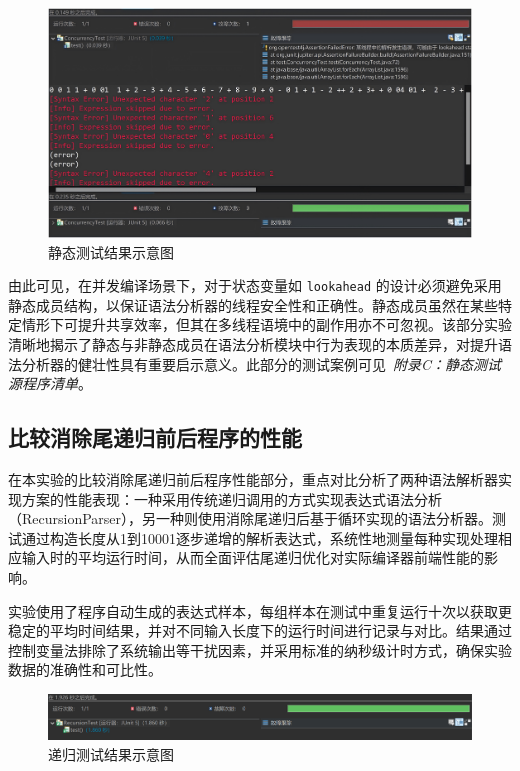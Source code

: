 \documentclass[a4paper, twoside, utf8]{ctexart}
\begin{document}
    \begin{figure}[htbp]
        \centering
        \includegraphics[width=0.8\linewidth]{figure/ConcurrencyTest.png}
        \caption{静态测试结果示意图}
    \end{figure}

    由此可见，在并发编译场景下，对于状态变量如 \verb|lookahead| 的设计必须避免采用静态成员结构，以保证语法分析器的线程安全性和正确性。静态成员虽然在某些特定情形下可提升共享效率，但其在多线程语境中的副作用亦不可忽视。该部分实验清晰地揭示了静态与非静态成员在语法分析模块中行为表现的本质差异，对提升语法分析器的健壮性具有重要启示意义。此部分的测试案例可见\ \textit{附录C：静态测试源程序清单}。

    \subsection{比较消除尾递归前后程序的性能}

    在本实验的比较消除尾递归前后程序性能部分，重点对比分析了两种语法解析器实现方案的性能表现：一种采用传统递归调用的方式实现表达式语法分析（RecursionParser），另一种则使用消除尾递归后基于循环实现的语法分析器。测试通过构造长度从1到10001逐步递增的解析表达式，系统性地测量每种实现处理相应输入时的平均运行时间，从而全面评估尾递归优化对实际编译器前端性能的影响。

    实验使用了程序自动生成的表达式样本，每组样本在测试中重复运行十次以获取更稳定的平均时间结果，并对不同输入长度下的运行时间进行记录与对比。结果通过控制变量法排除了系统输出等干扰因素，并采用标准的纳秒级计时方式，确保实验数据的准确性和可比性。

    \begin{figure}[htbp]
        \centering
        \includegraphics[width=0.8\linewidth]{figure/RecursionTest.png}
        \caption{递归测试结果示意图}
    \end{figure}
    
\end{document}
